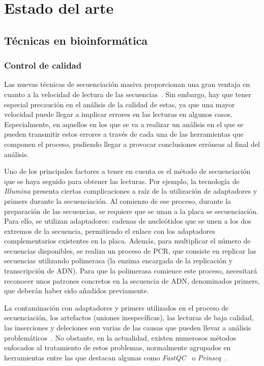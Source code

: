 \chapter{Estado del arte}
\label{chap:estadodelarte}

\section{Técnicas en bioinformática}

\subsection{Control de calidad}
Las nuevas técnicas de secuenciación masiva proporcionan una gran ventaja en cuanto a la velocidad de lectura de las secuencias~\cite{ngs}. Sin embargo, hay que tener especial precaución en el análisis de la calidad de estas, ya que una mayor velocidad puede llegar a implicar errores en las lecturas en algunos casos. Especialmente, en aquellos en los que se va a realizar un análisis en el que se pueden transmitir estos errores a través de cada una de las herramientas que componen el proceso, pudiendo llegar a provocar conclusiones erróneas al final del análisis.

Uno de los principales factores a tener en cuenta es el método de secuenciación que se haya seguido para obtener las lecturas. Por ejemplo, la tecnología de \textit{Illumina} presenta ciertas complicaciones a raíz de la utilización de adaptadores y primers durante la secuenciación. Al comienzo de ese proceso, durante la preparación de las secuencias, se requiere que se unan a la placa se secuenciación. Para ello, se utilizan adaptadores: cadenas de nucleótidos que se unen a los dos extremos de la secuencia, permitiendo el enlace con los adaptadores complementarios existentes en la placa. Además, para multiplicar el número de secuencias disponibles, se realiza un proceso de PCR, que consiste en replicar las secuencias utilizando polimerasa (la enzima encargada de la replicación y transcripción de ADN). Para que la polimerasa comience este proceso, necesitará reconocer unos patrones concretos en la secuencia de ADN, denominados primers, que deberán haber sido añadidos previamente.

La contaminación con adaptadores y primers utilizados en el proceso de secuenciación, los artefactos (uniones inespecíficas), las lecturas de baja calidad, las inserciones y deleciones son varias de las causas que pueden llevar a análisis problemáticos~\cite{plosone}. No obstante, en la actualidad, existen numerosos métodos enfocados al tratamiento de estos problemas, normalmente agrupados en herramientas entre las que destacan algunas como \textit{FastQC}~\cite{fastqc} o \textit{Prinseq}~\cite{schmieder_prinseq}.

